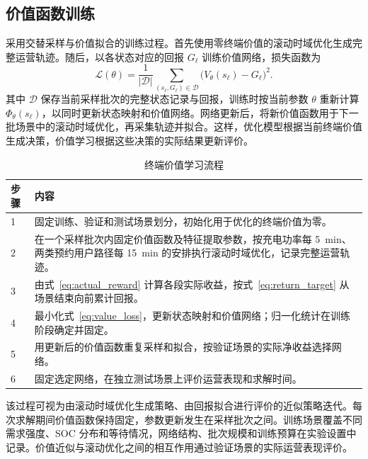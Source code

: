 \subsection{价值函数训练}
\label{sec:training}
采用交替采样与价值拟合的训练过程。首先使用零终端价值的滚动时域优化生成完整运营轨迹。随后，以各状态对应的回报 $G_\ell$ 训练价值网络，损失函数为
\begin{equation}
\mathcal L(\theta)=\frac{1}{|\mathcal D|}
\sum_{(s_\ell,G_\ell)\in\mathcal D}
\bigl(V_\theta(s_\ell)-G_\ell\bigr)^2.
\label{eq:value_loss}
\end{equation}
其中 $\mathcal D$ 保存当前采样批次的完整状态记录与回报，训练时按当前参数 $\theta$ 重新计算 $\Phi_\theta(s_\ell)$，以同时更新状态映射和价值网络。网络更新后，将新价值函数用于下一批场景中的滚动时域优化，再采集轨迹并拟合。这样，优化模型根据当前终端价值生成决策，价值学习根据这些决策的实际结果更新评价。

\begin{table}[!htbp]
\centering
\caption{终端价值学习流程}
\label{tab:training_algorithm}
\begin{tabularx}{\linewidth}{@{}lX@{}}
\toprule 步骤 & 内容 \\ \midrule
1 & 固定训练、验证和测试场景划分，初始化用于优化的终端价值为零。\\
2 & 在一个采样批次内固定价值函数及特征提取参数，按充电功率每 5~min、两类预约用户路径每 15~min 的安排执行滚动时域优化，记录完整运营轨迹。\\
3 & 由式~\eqref{eq:actual_reward} 计算各段实际收益，按式~\eqref{eq:return_target} 从场景结束向前累计回报。\\
4 & 最小化式~\eqref{eq:value_loss}，更新状态映射和价值网络；归一化统计在训练阶段确定并固定。\\
5 & 用更新后的价值函数重复采样和拟合，按验证场景的实际净收益选择网络。\\
6 & 固定选定网络，在独立测试场景上评价运营表现和求解时间。\\
\bottomrule
\end{tabularx}
\end{table}

该过程可视为由滚动时域优化生成策略、由回报拟合进行评价的近似策略迭代。每次求解期间价值函数保持固定，参数更新发生在采样批次之间。训练场景覆盖不同需求强度、SOC 分布和等待情况，网络结构、批次规模和训练预算在实验设置中记录。价值近似与滚动优化之间的相互作用通过验证场景的实际运营表现评价。

